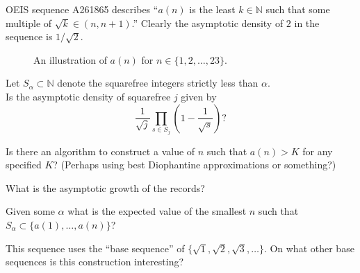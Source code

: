 \documentclass{article}
\begin{document}
  OEIS sequence A261865 describes ``$a(n)$ is the least $k \in \mathbb{N}$ such
  that some multiple of $\sqrt{k} \in (n, n+1)$.'' Clearly the asymptotic
  density of $2$ in the sequence is $1/\sqrt{2}$.
\begin{figure}[!h]
  \centering
  \caption{
    An illustration of $a(n)$ for $n \in \{1,2,\hdots,23\}$.
  }
\end{figure}

\begin{question}
  Let $S_\alpha \subset \mathbb{N}$ denote the squarefree integers strictly
  less than $\alpha$.\\
  Is the asymptotic density of squarefree $j$ given by \[
    \frac{1}{\sqrt{j}}\prod_{s \in S_j}\left(1 - \frac{1}{\sqrt{s}}\right)?
  \]
\end{question}

\begin{related}
  \item Is there an algorithm to construct a value of $n$ such that $a(n) > K$
    for any specified $K$?
    (Perhaps using best Diophantine approximations or something?)
  \item What is the asymptotic growth of the records?
  \item Given some $\alpha$ what is the expected value of the smallest $n$ such
    that $S_\alpha \subset \{a(1), \hdots, a(n)\}$?
  \item This sequence uses the ``base sequence'' of
    $\{\sqrt{1},\sqrt{2},\sqrt{3},\hdots\}$. On what other base sequences is
    this construction interesting?
\end{related}
\end{document}
